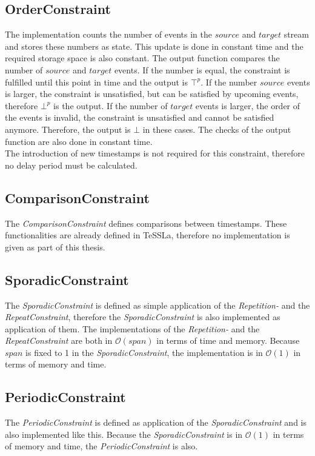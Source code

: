 \subsection{OrderConstraint}
	The implementation counts the number of events in the $source$ and $target$ stream and stores these numbers as state. This update is done in constant time and the required storage space is also constant. The output function compares the number of $source$ and $target$ events. If the number is equal, the constraint is fulfilled until this point in time and the output is $\top^p$. If the number $source$ events is larger, the constraint is unsatisfied, but can be satisfied by upcoming events, therefore $\bot^p$ is the output. If the number of $target$ events is larger, the order of the events is invalid, the constraint is unsatisfied and cannot be satisfied anymore. Therefore, the output is $\bot$ in these cases. The checks of the output function are also done in constant time.\\
	The introduction of new timestamps is not required for this constraint, therefore no delay period must be calculated.
	
\subsection{ComparisonConstraint}
	The \emph{ComparisonConstraint} defines comparisons between timestamps. These functionalities are already defined in TeSSLa, therefore no implementation is given as part of this thesis.  
	
\subsection{SporadicConstraint}
	The \emph{SporadicConstraint} is defined as simple application of the \emph{Repetition-} and the \emph{RepeatConstraint}, therefore the \emph{SporadicConstraint} is also implemented as application of them. The implementations of the \emph{Repetition-} and the \emph{RepeatConstraint} are both in $\mathcal{O}(span)$ in terms of time and memory. Because $span$ is fixed to 1 in the \textit{SporadicConstraint}, the implementation is in $\mathcal{O}(1)$ in terms of memory and time.
	
\subsection{PeriodicConstraint}
	The \emph{PeriodicConstraint} is defined as application of the \emph{SporadicConstraint} and is also implemented like this. Because the \emph{SporadicConstraint} is in $\mathcal{O}(1)$ in terms of memory and time, the \emph{PeriodicConstraint} is also.
	
